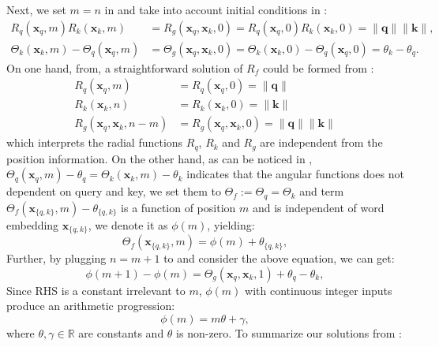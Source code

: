 \documentclass{article}
\def\q{{\boldsymbol q}}
\def\k{{\boldsymbol k}}
\def\x{{\boldsymbol x}}
\begin{document}
Next, we set $m=n$ in  and take into account initial conditions in : 
\begin{subequations}
	\begin{align}
		R_q(\x_q, m)R_k(\x_k, m) &= R_g(\x_q, \x_k, 0) = R_q(\x_q, 0)R_k(\x_k, 0)  = \|\q\|\|\k\| \label{fn:deri-solveR},\\
		\Theta_k(\x_k, m) - \Theta_q(\x_q, m) &= \Theta_g(\x_q, \x_k, 0) =\Theta_k(\x_k, 0) - \Theta_q(\x_q, 0) =  \theta_k - \theta_q \label{fn:deri-solveTheta}.
	\end{align}
\end{subequations}
On one hand, from, a straightforward solution of $R_f$ could be formed from  : 
\begin{equation}
	\begin{aligned}
		R_q(\x_q, m) &= R_q(\x_q, 0) =  \|\q\| \\
		R_k(\x_k, n) &= R_k(\x_k, 0) = \|\k\|\\
		R_g(\x_q, \x_k, n - m) &= R_g(\x_q, \x_k, 0) =  \|\q\|\|\k\|
	\end{aligned}
	\label{fn:deri-solR1}
\end{equation}
which interprets the radial functions $R_q$, $R_k$ and $R_g$ are independent from the position information. On the other hand, as can be noticed in ,  $\Theta_q(\x_q, m) - \theta_q = \Theta_k(\x_k, m) - \theta_k$ indicates that the angular functions does not dependent on query and key, we set them to  $\Theta_f := \Theta_q = \Theta_k$ and term $\Theta_f(\x_{\{q, k\}}, m) - \theta_{\{q, k\}}$ is a function of position $m$ and is independent of word embedding $\x_{\{q, k\}}$, we denote it as $\phi(m)$, yielding:
\begin{equation}
	\Theta_f(\x_{\{q, k\}}, m) = \phi(m) + \theta_{\{q,k\}},
	\label{fn:deri-solTheta1}
\end{equation}
Further, by plugging  $n = m + 1$ to  and consider the above equation, we can get: 
\begin{equation}
	\phi(m + 1) - \phi(m) = \Theta_g(\x_q, \x_k, 1) + \theta_q - \theta_k,
	\label{fn:deri-solTheta2}
\end{equation}
Since RHS is a constant irrelevant to $m$, $\phi(m)$ with continuous integer inputs produce an arithmetic progression:
\begin{equation}
	\phi(m) = m\theta + \gamma,
	\label{fn:deri-solTheta3}
\end{equation}
where $\theta,\gamma \in \mathbb{R}$ are constants and $\theta$ is non-zero. To summarize our solutions from :
\end{document}
